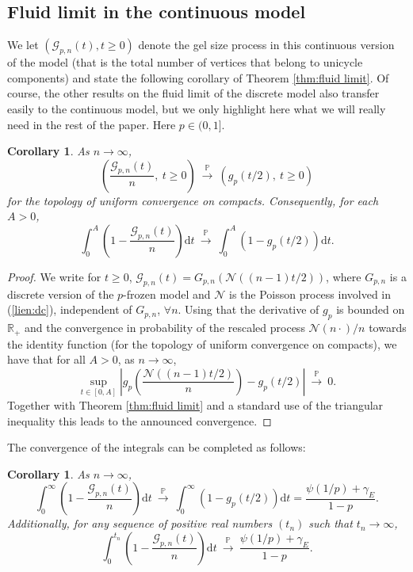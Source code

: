 \documentclass[a4, 11pt]{article}
\numberwithin{equation}{section}
\theoremstyle{plain}
\newtheorem{corollary}[theorem]{Corollary}
\theoremstyle{definition}
\theoremstyle{remark}
\begin{document}
\subsection{Fluid limit in the continuous model}
\label{sec:flcontinuous}

We let $(\mathcal G_{p,n}(t),t\geq 0)$ denote the gel size process in this continuous version of the model (that is the total number of vertices that belong to unicycle components) and state the following corollary of Theorem \ref{thm:fluid limit}. Of course, the other results on the fluid limit of the discrete model also transfer easily to the continuous model, but we  only highlight here what we will really need in the rest of the paper. Here $p \in(0,1]$.

\begin{corollary}
\label{cor:continuous_cv}
As $n \rightarrow \infty$,
$$\left(\frac{\mathcal G_{p,n}(t)}{n},~ t \geq 0 \right)~\overset{\mathbb P}\longrightarrow~\left(g_p(t/2),~ t\geq 0\right)$$
for the topology of uniform convergence on compacts. Consequently, for each $A>0$,
$$
 \int_0^{A} \left(1-\frac{\mathcal G_{p,n}(t)}{n}\right) \mathrm dt~\overset{\mathbb P}\longrightarrow~\int_0^{A} \left(1-g_p(t/2)  \right) \mathrm dt.
$$
\end{corollary}

\begin{proof} We write for $t\geq0$, $\mathcal G_{p,n}(t)=G_{p,n}(\mathcal N((n-1)t/2))$, where $G_{p,n}$ is a discrete version of the $p$-frozen model and $\mathcal N$ is the Poisson process involved in (\ref{lien:dc}), independent of $G_{p,n}$, $\forall n$.  
Using that the derivative of $g_p$ is bounded on $\mathbb R_+$ and the convergence in probability of the rescaled process $\mathcal N(n \cdot)/n$ towards the identity function (for the topology of uniform convergence on compacts), we have that for all $A>0$, as $n \rightarrow \infty$,
$$
\sup_{t \in [0,A]} \left| g_p\left(\frac{\mathcal N((n-1)t/2)}{n}\right)-g_p(t/2)\right|~\overset{\mathbb P} \longrightarrow~0.
$$
Together with Theorem \ref{thm:fluid limit} and a standard use of the triangular inequality this leads to the announced convergence.
\end{proof}

\medskip

The convergence of the integrals can be completed as follows:

\begin{corollary}
\label{cor:cvintegrale}
As $n \rightarrow \infty$,
$$\int_0^{\infty} \left(1-\frac{\mathcal G_{p,n}(t)}{n} \right) \mathrm dt~\overset{\mathbb P}\longrightarrow~\int_0^{\infty} \left(1-g_p(t/2)\right) \mathrm dt=\frac{\psi(1/p)+\gamma_E}{1-p}.$$
Additionally, for any sequence of positive real numbers $(t_n)$ such that $t_n \rightarrow \infty$,
$$\int_0^{t_n} \left(1-\frac{\mathcal G_{p,n}(t)}{n} \right) \mathrm dt~\overset{\mathbb P}\longrightarrow~\frac{\psi(1/p)+\gamma_E}{1-p}.$$
\end{corollary}
\end{document}
